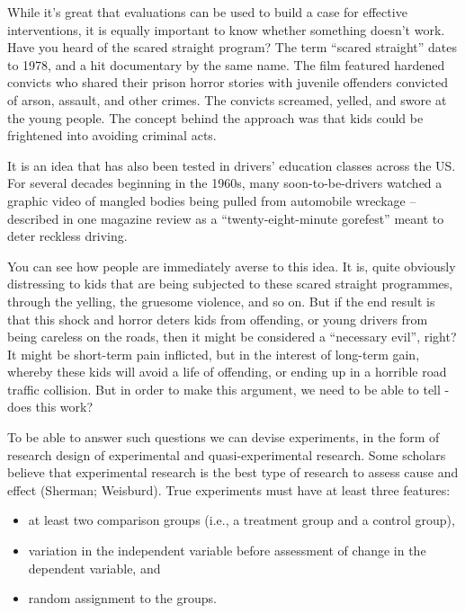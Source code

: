\documentclass[]{book}
\providecommand{\tightlist}{%
  \setlength{\itemsep}{0pt}\setlength{\parskip}{0pt}}
\theoremstyle{definition}
\theoremstyle{definition}
\theoremstyle{definition}
\theoremstyle{remark}
\begin{document}
While it's great that evaluations can be used to build a case for
effective interventions, it is equally important to know whether
something doesn't work. Have you heard of the scared straight program?
The term ``scared straight'' dates to 1978, and a hit documentary by the
same name. The film featured hardened convicts who shared their prison
horror stories with juvenile offenders convicted of arson, assault, and
other crimes. The convicts screamed, yelled, and swore at the young
people. The concept behind the approach was that kids could be
frightened into avoiding criminal acts.

It is an idea that has also been tested in drivers' education classes
across the US. For several decades beginning in the 1960s, many
soon-to-be-drivers watched a graphic video of mangled bodies being
pulled from automobile wreckage -- described in one magazine review as a
``twenty-eight-minute gorefest'' meant to deter reckless driving.

You can see how people are immediately averse to this idea. It is, quite
obviously distressing to kids that are being subjected to these scared
straight programmes, through the yelling, the gruesome violence, and so
on. But if the end result is that this shock and horror deters kids from
offending, or young drivers from being careless on the roads, then it
might be considered a ``necessary evil'', right? It might be short-term
pain inflicted, but in the interest of long-term gain, whereby these
kids will avoid a life of offending, or ending up in a horrible road
traffic collision. But in order to make this argument, we need to be
able to tell - does this work?

To be able to answer such questions we can devise experiments, in the
form of research design of experimental and quasi-experimental research.
Some scholars believe that experimental research is the best type of
research to assess cause and effect (Sherman; Weisburd). True
experiments must have at least three features:

\begin{itemize}
\tightlist
\item
  at least two comparison groups (i.e., a treatment group and a control
  group),
\item
  variation in the independent variable before assessment of change in
  the dependent variable, and
\item
  random assignment to the groups.
\end{itemize}
\end{document}
